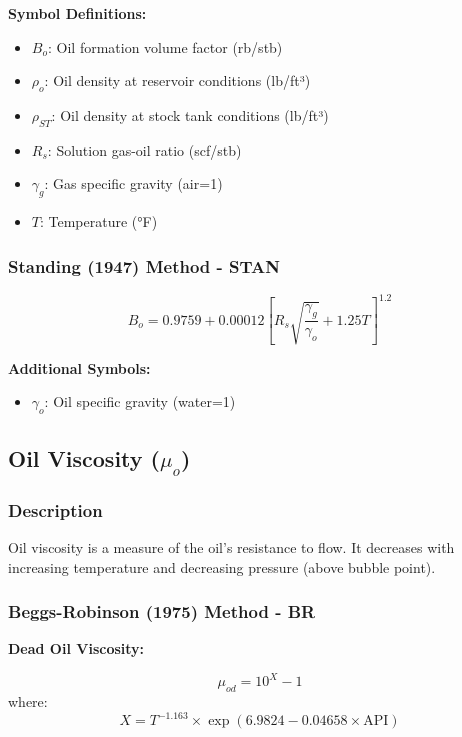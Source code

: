 \documentclass[11pt,a4paper]{article}
\newcommand{\symitem}[2]{\item \textbf{#1}: #2}
\begin{document}
\textbf{Symbol Definitions:}
\begin{itemize}[leftmargin=2cm]
\symitem{$B_o$}{Oil formation volume factor (rb/stb)}
\symitem{$\rho_o$}{Oil density at reservoir conditions (lb/ft³)}
\symitem{$\rho_{ST}$}{Oil density at stock tank conditions (lb/ft³)}
\symitem{$R_s$}{Solution gas-oil ratio (scf/stb)}
\symitem{$\gamma_g$}{Gas specific gravity (air=1)}
\symitem{$T$}{Temperature (°F)}
\end{itemize}

\subsubsection{Standing (1947) Method - STAN}

\begin{tcolorbox}[colback=formulabox,colframe=black!75]
\begin{equation}
B_o = 0.9759 + 0.00012 \left[ R_s \sqrt{\frac{\gamma_g}{\gamma_o}} + 1.25 T \right]^{1.2}
\end{equation}
\end{tcolorbox}

\textbf{Additional Symbols:}
\begin{itemize}[leftmargin=2cm]
\symitem{$\gamma_o$}{Oil specific gravity (water=1)}
\end{itemize}

\subsection{Oil Viscosity ($\mu_o$)}

\subsubsection{Description}
Oil viscosity is a measure of the oil's resistance to flow. It decreases with increasing temperature and decreasing pressure (above bubble point).

\subsubsection{Beggs-Robinson (1975) Method - BR}

\textbf{Dead Oil Viscosity:}
\begin{tcolorbox}[colback=formulabox,colframe=black!75]
\begin{equation}
\mu_{od} = 10^X - 1
\end{equation}
where:
\begin{equation}
X = T^{-1.163} \times \exp(6.9824 - 0.04658 \times \text{API})
\end{equation}
\end{tcolorbox}
\end{document}
